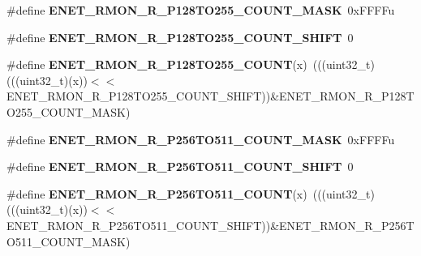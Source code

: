 \begin{DoxyCompactItemize}
\item 
\#define {\bfseries E\+N\+E\+T\+\_\+\+R\+M\+O\+N\+\_\+\+R\+\_\+\+P128\+T\+O255\+\_\+\+C\+O\+U\+N\+T\+\_\+\+M\+A\+SK}~0x\+F\+F\+F\+Fu\hypertarget{group__ENET__Register__Masks_ga2d2913a282b447ccbf47ab61daa15197}{}\label{group__ENET__Register__Masks_ga2d2913a282b447ccbf47ab61daa15197}

\item 
\#define {\bfseries E\+N\+E\+T\+\_\+\+R\+M\+O\+N\+\_\+\+R\+\_\+\+P128\+T\+O255\+\_\+\+C\+O\+U\+N\+T\+\_\+\+S\+H\+I\+FT}~0\hypertarget{group__ENET__Register__Masks_gad89a09873f7fb8686264696f1bf396ea}{}\label{group__ENET__Register__Masks_gad89a09873f7fb8686264696f1bf396ea}

\item 
\#define {\bfseries E\+N\+E\+T\+\_\+\+R\+M\+O\+N\+\_\+\+R\+\_\+\+P128\+T\+O255\+\_\+\+C\+O\+U\+NT}(x)~(((uint32\+\_\+t)(((uint32\+\_\+t)(x))$<$$<$E\+N\+E\+T\+\_\+\+R\+M\+O\+N\+\_\+\+R\+\_\+\+P128\+T\+O255\+\_\+\+C\+O\+U\+N\+T\+\_\+\+S\+H\+I\+FT))\&E\+N\+E\+T\+\_\+\+R\+M\+O\+N\+\_\+\+R\+\_\+\+P128\+T\+O255\+\_\+\+C\+O\+U\+N\+T\+\_\+\+M\+A\+SK)\hypertarget{group__ENET__Register__Masks_gab372fe7172a4f45b6c4213ba33fbc596}{}\label{group__ENET__Register__Masks_gab372fe7172a4f45b6c4213ba33fbc596}

\item 
\#define {\bfseries E\+N\+E\+T\+\_\+\+R\+M\+O\+N\+\_\+\+R\+\_\+\+P256\+T\+O511\+\_\+\+C\+O\+U\+N\+T\+\_\+\+M\+A\+SK}~0x\+F\+F\+F\+Fu\hypertarget{group__ENET__Register__Masks_ga0e2ba73bff150ae6ebad2d1b312a6ba2}{}\label{group__ENET__Register__Masks_ga0e2ba73bff150ae6ebad2d1b312a6ba2}

\item 
\#define {\bfseries E\+N\+E\+T\+\_\+\+R\+M\+O\+N\+\_\+\+R\+\_\+\+P256\+T\+O511\+\_\+\+C\+O\+U\+N\+T\+\_\+\+S\+H\+I\+FT}~0\hypertarget{group__ENET__Register__Masks_ga884a28c733b9e8454b467dabce9d1059}{}\label{group__ENET__Register__Masks_ga884a28c733b9e8454b467dabce9d1059}

\item 
\#define {\bfseries E\+N\+E\+T\+\_\+\+R\+M\+O\+N\+\_\+\+R\+\_\+\+P256\+T\+O511\+\_\+\+C\+O\+U\+NT}(x)~(((uint32\+\_\+t)(((uint32\+\_\+t)(x))$<$$<$E\+N\+E\+T\+\_\+\+R\+M\+O\+N\+\_\+\+R\+\_\+\+P256\+T\+O511\+\_\+\+C\+O\+U\+N\+T\+\_\+\+S\+H\+I\+FT))\&E\+N\+E\+T\+\_\+\+R\+M\+O\+N\+\_\+\+R\+\_\+\+P256\+T\+O511\+\_\+\+C\+O\+U\+N\+T\+\_\+\+M\+A\+SK)\hypertarget{group__ENET__Register__Masks_gacf7caa034e550af1f45e8821dcebcb0e}{}\label{group__ENET__Register__Masks_gacf7caa034e550af1f45e8821dcebcb0e}


\end{DoxyCompactItemize}
